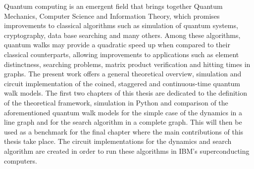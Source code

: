 \documentclass[../../dissertation.tex]{subfiles}
\begin{document}
Quantum computing is an emergent field that brings together Quantum Mechanics,
Computer Science and Information Theory, which promises improvements to
classical algorithms such as simulation of quantum systems, cryptography, data
base searching and many others.  Among these algorithms, quantum walks may provide
a quadratic speed up when compared to their classical  counterparts,  allowing
improvements to applications such as element distinctness, searching problems,
matrix product verification and hitting times in graphs.  The present work
offers a general theoretical overview, simulation and circuit implementation of
the coined, staggered and continuous-time quantum walk models. The first two
chapters of this thesis are dedicated to the definition of the theoretical
framework, simulation in Python and comparison of the aforementioned quantum
walk models for the simple case of the dynamics in a line graph and for the
search algorithm in a complete graph. This will then be used as a benchmark
for the final chapter where the main contributions of this thesis take place. The circuit implementations for the dynamics and search algorithm are
created in order to run these algorithms in IBM's superconducting computers.
\end{document}
